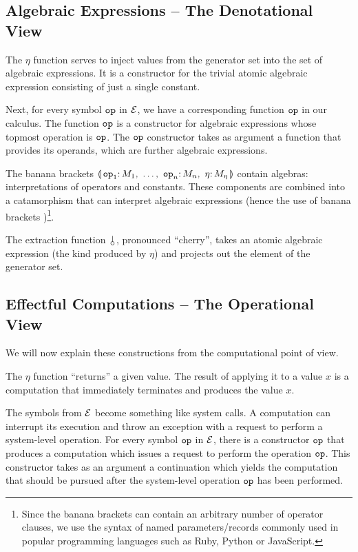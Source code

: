 \subsection*{Algebraic Expressions -- The Denotational View}

The $\eta$ function serves to inject values from the generator set into the
set of algebraic expressions. It is a constructor for the trivial atomic
algebraic expression consisting of just a single constant.

Next, for every symbol $\mathtt{op}$ in $\mathcal{E}$, we have a corresponding function
$\mathtt{op}$ in our calculus. The function $\mathtt{op}$ is a constructor for
algebraic expressions whose topmost operation is $\mathtt{op}$. The $\mathtt{op}$
constructor takes as argument a function that provides its operands, which
are further algebraic expressions.

The banana brackets $\cdbanana$ contain algebras: interpretations of
operators and constants. These components are combined into a catamorphism
that can interpret algebraic expressions (hence the use of banana brackets
\cite{meijer1991functional})\footnote{Since the banana brackets can contain
  an arbitrary number of operator clauses, we use the syntax of named
  parameters/records commonly used in popular programming languages such as
  Ruby, Python or JavaScript.}.

The extraction function $\cherry$, pronounced ``cherry'', takes an atomic
algebraic expression (the kind produced by $\eta$) and projects out the
element of the generator set.

\subsection*{Effectful Computations -- The Operational View}

We will now explain these constructions from the computational point of
view.

The $\eta$ function ``returns'' a given value. The result of applying it to
a value $x$ is a computation that immediately terminates and produces the
value $x$.

The symbols from $\mathcal{E}$ become something like system calls. A computation
can interrupt its execution and throw an exception with a request to
perform a system-level operation. For every symbol $\mathtt{op}$ in $\mathcal{E}$,
there is a constructor $\mathtt{op}$ that produces a computation which issues a
request to perform the operation $\mathtt{op}$. This constructor takes as an
argument a continuation which yields the computation that should be pursued
after the system-level operation $\mathtt{op}$ has been performed.

